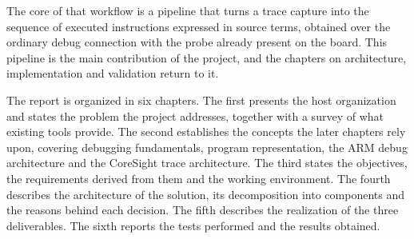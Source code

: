 The core of that workflow is a pipeline that turns a trace capture into the sequence of executed instructions expressed in source terms, obtained over the ordinary debug connection with the probe already present on the board. This pipeline is the main contribution of the project, and the chapters on architecture, implementation and validation return to it.

The report is organized in six chapters. The first presents the host organization and states the problem the project addresses, together with a survey of what existing tools provide. The second establishes the concepts the later chapters rely upon, covering debugging fundamentals, program representation, the ARM debug architecture and the CoreSight trace architecture. The third states the objectives, the requirements derived from them and the working environment. The fourth describes the architecture of the solution, its decomposition into components and the reasons behind each decision. The fifth describes the realization of the three deliverables. The sixth reports the tests performed and the results obtained.
